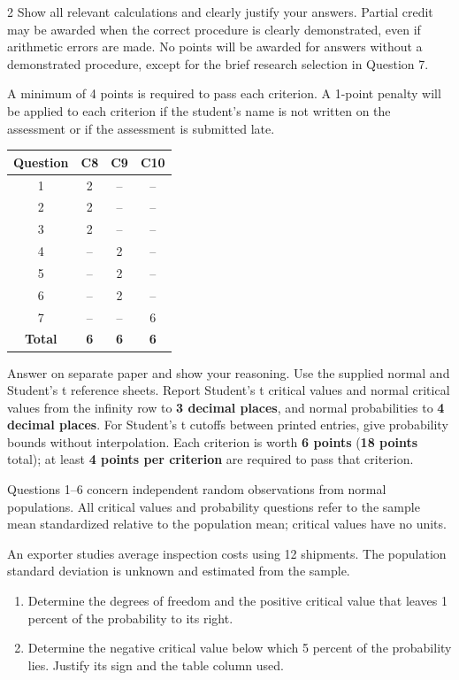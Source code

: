 \begin{multicols}{2}
\vspace{-0.25cm}
Show all relevant calculations and clearly justify your answers. Partial credit may be awarded when the correct procedure is clearly demonstrated, even if arithmetic errors are made. No points will be awarded for answers without a demonstrated procedure, except for the brief research selection in Question 7.

A minimum of 4 points is required to pass each criterion. A 1-point penalty will be applied to each criterion if the student's name is not written on the assessment or if the assessment is submitted late.

\begin{center}
\begin{tabular}{|c|c|c|c|}
\hline
\textbf{Question} & \textbf{C8} & \textbf{C9} & \textbf{C10} \\ \hline
1 & 2 & -- & -- \\ \hline
2 & 2 & -- & -- \\ \hline
3 & 2 & -- & -- \\ \hline
4 & -- & 2 & -- \\ \hline
5 & -- & 2 & -- \\ \hline
6 & -- & 2 & -- \\ \hline
7 & -- & -- & 6 \\ \hline
\textbf{Total} & \textbf{6} & \textbf{6} & \textbf{6} \\ \hline
\end{tabular}
\end{center}

Answer on separate paper and show your reasoning. Use the supplied normal and Student's t reference sheets.
Report Student's t critical values and normal critical values from the infinity row to \textbf{3 decimal places}, and normal probabilities to \textbf{4 decimal places}.
For Student's t cutoffs between printed entries, give probability bounds without interpolation.
Each criterion is worth \textbf{6 points} (\textbf{18 points} total); at least \textbf{4 points per criterion} are required to pass that criterion.

Questions 1--6 concern independent random observations from normal populations.
All critical values and probability questions refer to the sample mean standardized relative to the population mean; critical values have no units.


An exporter studies average inspection costs using 12 shipments. The population standard deviation is unknown and estimated from the sample.
\begin{enumerate}[label=\textbf{(\alph*)},leftmargin=*]
\item Determine the degrees of freedom and the positive critical value that leaves 1 percent of the probability to its right. 
\item Determine the negative critical value below which 5 percent of the probability lies. Justify its sign and the table column used. 
\end{enumerate}


\end{multicols}
